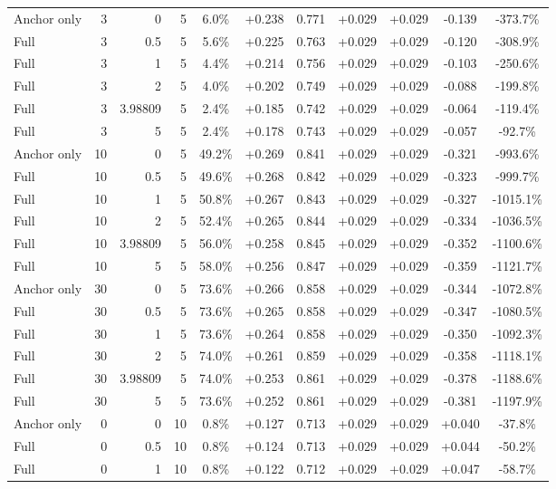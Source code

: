 \begin{table}[htbp]
\begin{tabular}{lrrrccccccc}
Anchor only & 3 & 0 & 5 & 6.0\% & +0.238 & 0.771 & +0.029 & +0.029 & -0.139 & -373.7\% \\
Full & 3 & 0.5 & 5 & 5.6\% & +0.225 & 0.763 & +0.029 & +0.029 & -0.120 & -308.9\% \\
Full & 3 & 1 & 5 & 4.4\% & +0.214 & 0.756 & +0.029 & +0.029 & -0.103 & -250.6\% \\
Full & 3 & 2 & 5 & 4.0\% & +0.202 & 0.749 & +0.029 & +0.029 & -0.088 & -199.8\% \\
Full & 3 & 3.98809 & 5 & 2.4\% & +0.185 & 0.742 & +0.029 & +0.029 & -0.064 & -119.4\% \\
Full & 3 & 5 & 5 & 2.4\% & +0.178 & 0.743 & +0.029 & +0.029 & -0.057 & -92.7\% \\
Anchor only & 10 & 0 & 5 & 49.2\% & +0.269 & 0.841 & +0.029 & +0.029 & -0.321 & -993.6\% \\
Full & 10 & 0.5 & 5 & 49.6\% & +0.268 & 0.842 & +0.029 & +0.029 & -0.323 & -999.7\% \\
Full & 10 & 1 & 5 & 50.8\% & +0.267 & 0.843 & +0.029 & +0.029 & -0.327 & -1015.1\% \\
Full & 10 & 2 & 5 & 52.4\% & +0.265 & 0.844 & +0.029 & +0.029 & -0.334 & -1036.5\% \\
Full & 10 & 3.98809 & 5 & 56.0\% & +0.258 & 0.845 & +0.029 & +0.029 & -0.352 & -1100.6\% \\
Full & 10 & 5 & 5 & 58.0\% & +0.256 & 0.847 & +0.029 & +0.029 & -0.359 & -1121.7\% \\
Anchor only & 30 & 0 & 5 & 73.6\% & +0.266 & 0.858 & +0.029 & +0.029 & -0.344 & -1072.8\% \\
Full & 30 & 0.5 & 5 & 73.6\% & +0.265 & 0.858 & +0.029 & +0.029 & -0.347 & -1080.5\% \\
Full & 30 & 1 & 5 & 73.6\% & +0.264 & 0.858 & +0.029 & +0.029 & -0.350 & -1092.3\% \\
Full & 30 & 2 & 5 & 74.0\% & +0.261 & 0.859 & +0.029 & +0.029 & -0.358 & -1118.1\% \\
Full & 30 & 3.98809 & 5 & 74.0\% & +0.253 & 0.861 & +0.029 & +0.029 & -0.378 & -1188.6\% \\
Full & 30 & 5 & 5 & 73.6\% & +0.252 & 0.861 & +0.029 & +0.029 & -0.381 & -1197.9\% \\
Anchor only & 0 & 0 & 10 & 0.8\% & +0.127 & 0.713 & +0.029 & +0.029 & +0.040 & -37.8\% \\
Full & 0 & 0.5 & 10 & 0.8\% & +0.124 & 0.713 & +0.029 & +0.029 & +0.044 & -50.2\% \\
Full & 0 & 1 & 10 & 0.8\% & +0.122 & 0.712 & +0.029 & +0.029 & +0.047 & -58.7\% \\

\end{tabular}
\end{table}
